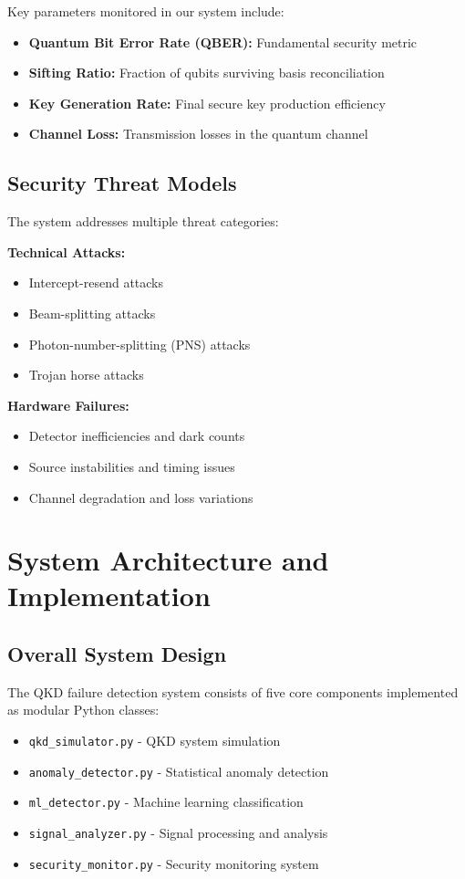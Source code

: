 \documentclass[12pt,a4paper]{article}
\begin{document}
Key parameters monitored in our system include:
\begin{itemize}
    \item \textbf{Quantum Bit Error Rate (QBER):} Fundamental security metric
    \item \textbf{Sifting Ratio:} Fraction of qubits surviving basis reconciliation
    \item \textbf{Key Generation Rate:} Final secure key production efficiency
    \item \textbf{Channel Loss:} Transmission losses in the quantum channel
\end{itemize}

\subsection{Security Threat Models}

The system addresses multiple threat categories:

\textbf{Technical Attacks:}
\begin{itemize}
    \item Intercept-resend attacks
    \item Beam-splitting attacks
    \item Photon-number-splitting (PNS) attacks
    \item Trojan horse attacks
\end{itemize}

\textbf{Hardware Failures:}
\begin{itemize}
    \item Detector inefficiencies and dark counts
    \item Source instabilities and timing issues
    \item Channel degradation and loss variations
\end{itemize}

\section{System Architecture and Implementation}

\subsection{Overall System Design}

The QKD failure detection system consists of five core components implemented as modular Python classes:

\begin{itemize}
    \item \texttt{qkd\_simulator.py} - QKD system simulation
    \item \texttt{anomaly\_detector.py} - Statistical anomaly detection
    \item \texttt{ml\_detector.py} - Machine learning classification
    \item \texttt{signal\_analyzer.py} - Signal processing and analysis
    \item \texttt{security\_monitor.py} - Security monitoring system
\end{itemize}
\end{document}
